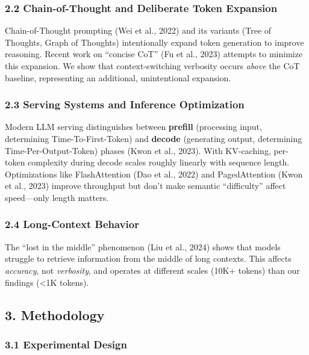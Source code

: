 \documentclass[
  11pt]{article}
\begin{document}
\subsubsection{2.2 Chain-of-Thought and Deliberate Token
Expansion}\label{chain-of-thought-and-deliberate-token-expansion}

Chain-of-Thought prompting (Wei et al., 2022) and its variants (Tree of
Thoughts, Graph of Thoughts) intentionally expand token generation to
improve reasoning. Recent work on ``concise CoT'' (Fu et al., 2023)
attempts to minimize this expansion. We show that context-switching
verbosity occurs \emph{above} the CoT baseline, representing an
additional, unintentional expansion.

\subsubsection{2.3 Serving Systems and Inference
Optimization}\label{serving-systems-and-inference-optimization}

Modern LLM serving distinguishes between \textbf{prefill} (processing
input, determining Time-To-First-Token) and \textbf{decode} (generating
output, determining Time-Per-Output-Token) phases (Kwon et al., 2023).
With KV-caching, per-token complexity during decode scales roughly
linearly with sequence length. Optimizations like FlashAttention (Dao et
al., 2022) and PagedAttention (Kwon et al., 2023) improve throughput but
don't make semantic ``difficulty'' affect speed---only length matters.

\subsubsection{2.4 Long-Context Behavior}\label{long-context-behavior}

The ``lost in the middle'' phenomenon (Liu et al., 2024) shows that
models struggle to retrieve information from the middle of long
contexts. This affects \emph{accuracy}, not \emph{verbosity}, and
operates at different scales (10K+ tokens) than our findings
(\textless1K tokens).

\subsection{3. Methodology}\label{methodology}

\subsubsection{3.1 Experimental Design}\label{experimental-design}
\end{document}
